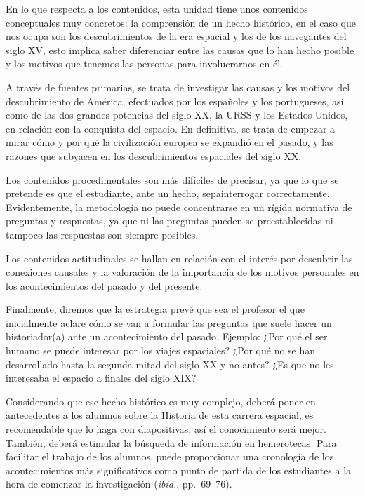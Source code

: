  
En lo que respecta a los contenidos, esta unidad tiene unos contenidos 
conceptuales muy concretos: la comprensión de un hecho histórico, en el 
caso que nos ocupa son los descubrimientos de la era espacial y los de 
los navegantes del siglo XV, esto implica saber diferenciar entre las 
causas que lo han hecho posible y los motivos que tenemos las personas 
para involucrarnos en él.

 
A través de fuentes primarias, se trata de investigar las causas y los 
motivos del descubrimiento de América, efectuados por los españoles y 
los portugueses, así como de las dos grandes potencias del siglo XX, la 
URSS y los Estados Unidos, en relación con la conquista del espacio. En 
definitiva, se trata de empezar a mirar cómo y por qué la civilización 
europea se expandió en el pasado, y las razones que subyacen en los 
descubrimientos espaciales del siglo XX\@.

 
Los contenidos procedimentales son más difíciles de precisar, ya que 
lo que se pretende es que el estudiante, ante un hecho, sepa\linebreak interrogar 
correctamente. Evidentemente, la metodología no puede concentrarse en un 
rígida normativa de preguntas y respuestas, ya que ni las preguntas 
pueden se preestablecidas ni tampoco las respuestas son siempre 
posibles.

 
Los contenidos actitudinales se hallan en relación con el interés por 
descubrir las conexiones causales y la valoración de la importancia de 
los motivos personales en los acontecimientos del pasado y del 
presente.

 
Finalmente, diremos que la estrategia prevé que sea el profesor el que 
inicialmente aclare cómo se van a formular las preguntas que suele 
hacer un historiador(a) ante un acontecimiento del pasado. Ejemplo: 
¿Por qué el ser humano se puede interesar por los viajes espaciales? 
¿Por qué no se han desarrollado hasta la segunda mitad del siglo XX y 
no antes? ¿Es que no les interesaba el espacio a finales del siglo XIX\@?
\enlargethispage{1\baselineskip}
 
Considerando que ese hecho histórico es muy complejo, deberá 
poner en antecedentes a los alumnos sobre la Historia de esta carrera 
espacial, es recomendable que lo haga con diapositivas, así el 
conocimiento será mejor. También, deberá estimular la búsqueda de 
información en hemerotecas. Para facilitar el trabajo de los alumnos, puede 
proporcionar una cronología de los acontecimientos más significativos 
como punto de partida de los estudiantes a la hora de comenzar la
investigación (\textit{ibid.}, pp.~69--76).

